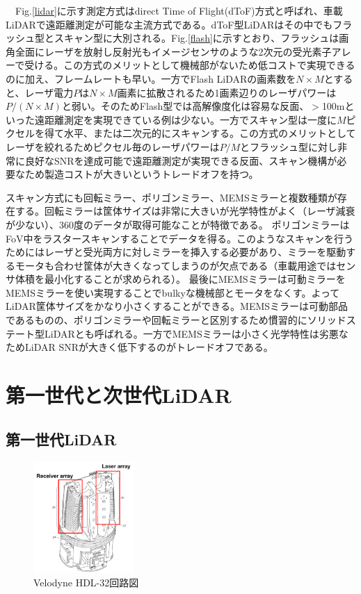 \documentclass[twocolumn, 11pt, a4j]{article}
\begin{document}
　Fig.\ref{lidar}に示す測定方式はdirect Time of Flight(dToF)方式と呼ばれ、車載LiDARで遠距離測定が可能な主流方式である。dToF型LiDARはその中でもフラッシュ型\cite{ximenes2018256}とスキャン型に大別される。Fig.\ref{flash}に示すとおり、フラッシュは画角全面にレーザを放射し反射光もイメージセンサのような2次元の受光素子アレーで受ける。この方式のメリットとして機械部がないため低コストで実現できるのに加え、フレームレートも早い。一方でFlash LiDARの画素数を$N\times M$とすると、レーザ電力$P$は$N\times M$画素に拡散されるため1画素辺りのレーザパワーは$P/(N \times M)$と弱い。そのためFlash型では高解像度化は容易な反面、$>$100mといった遠距離測定を実現できている例は少ない。一方でスキャン型は一度に$M$ピクセルを得て水平、または二次元的にスキャンする。この方式のメリットとしてレーザを絞れるためピクセル毎のレーザパワーは$P/M$とフラッシュ型に対し非常に良好なSNRを達成可能で遠距離測定が実現できる反面、スキャン機構が必要なため製造コストが大きいというトレードオフを持つ。

スキャン方式にも回転ミラー\cite{velodyne,ouster}、ポリゴンミラー\cite{niclass2012100,yoshioka201820,kondo2020automotive}、MEMSミラー\cite{kumagai2021189x600}と複数種類が存在する。回転ミラーは筐体サイズは非常に大きいが光学特性がよく（レーザ減衰が少ない）、360度のデータが取得可能なことが特徴である。
ポリゴンミラーはFoV中をラスタースキャンすることでデータを得る。このようなスキャンを行うためにはレーザと受光両方に対しミラーを挿入する必要があり、ミラーを駆動するモータも合わせ筐体が大きくなってしまうのが欠点である（車載用途ではセンサ体積を最小化することが求められる）。
最後にMEMSミラーは可動ミラーをMEMSミラーを使い実現することでbulkyな機械部とモータをなくす。よってLiDAR筐体サイズをかなり小さくすることができる。MEMSミラーは可動部品であるものの、ポリゴンミラーや回転ミラーと区別するため慣習的にソリッドステート型LiDARとも呼ばれる。一方でMEMSミラーは小さく光学特性は劣悪なためLiDAR SNRが大きく低下するのがトレードオフである。

\section{第一世代と次世代LiDAR}
\subsection{第一世代LiDAR}
\begin{figure}[!t]
\centering
 \includegraphics[width=0.34\textwidth]{figs/velo.png}
  \caption{Velodyne HDL-32回路図 \cite{velopatent}}
\label{velo}
\end{figure}
\end{document}
